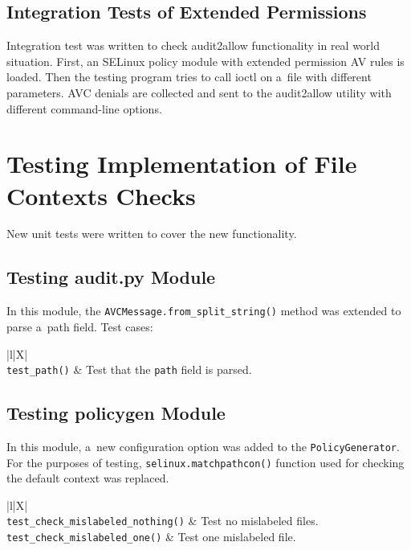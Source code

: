 \subsection{Integration Tests of Extended Permissions}

Integration test was written to check audit2allow functionality in real world
situation. First, an SELinux policy module with extended permission AV rules is
loaded. Then the testing program tries to call ioctl on a~file with different
parameters. AVC denials are collected and sent to the audit2allow utility with
different command-line options.

\section{Testing Implementation of File Contexts Checks}
New unit tests were written to cover the new functionality.

\subsection{Testing audit.py Module}
In this module, the \texttt{AVCMessage.from\_split\_string()} method was
extended to parse a~path field. Test cases:
\begin{longtabu}{|l|X|} \hline
    \\ \hline
    \texttt{test\_path()} & Test that the \texttt{path} field is parsed.
    \\ \hline
\end{longtabu}

\subsection{Testing policygen Module}
In this module, a~new configuration option was added to the
\texttt{PolicyGenerator}. For the purposes of testing,
\texttt{selinux.matchpathcon()} function used for checking the default context
was replaced. 
\begin{longtabu}{|l|X|} \hline
    \\ \hline
    \texttt{test\_check\_mislabeled\_nothing()} & Test no mislabeled files.
    \\ \hline
    \texttt{test\_check\_mislabeled\_one()} & Test one mislabeled file.
    \\ \hline
\end{longtabu}

